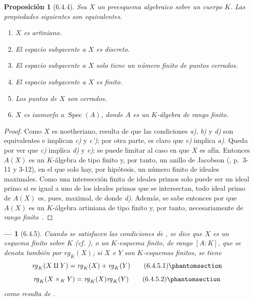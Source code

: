 \documentclass[oneside]{amsart}
\theoremstyle{ega-env-style}
\newtheorem*{env}{---}
\theoremstyle{ega-thm-env-style}
\newtheorem*{proposition}{Proposición}
\theoremstyle{ega-defn-env-style}
\let\EGAOriginalLabel\label
\renewcommand{\label}[1]{\phantomsection\EGAOriginalLabel{#1}}
\begin{document}
\begin{proposition}[6.4.4]
\label{I.6.4.4}
Sea $X$ un preesquema algebraico sobre un cuerpo $K$.
Las propiedades siguientes son equivalentes.
\begin{enumerate}
  \item[{\textup{a)}}] $X$ es artiniano.
  \item[{\textup{b)}}] El espacio subyacente a $X$ es discreto.
  \item[{\textup{c)}}] El espacio subyacente a $X$ solo tiene un número finito de puntos cerrados.
  \item[{\textup{c')}}] El espacio subyacente a $X$ es finito.
  \item[{\textup{d)}}] Los puntos de $X$ son cerrados.
  \item[{\textup{e)}}] $X$ es isomorfo a $\operatorname{Spec}(A)$, donde $A$ es un $K$-álgebra de rango finito.
\end{enumerate}
\end{proposition}

\begin{proof}
Como $X$ es noetheriano, resulta de  que las condiciones \emph{a)}, \emph{b)} y \emph{d)} son equivalentes e implican \emph{c)} y \emph{c')};
por otra parte, es claro que \emph{e)} implica \emph{a)}.
Queda por ver que \emph{c)} implica \emph{d)} y \emph{e)};
se puede limitar al caso en que $X$ es afín.
Entonces $A(X)$ es un $K$-álgebra de tipo finito  y, por tanto, un anillo de Jacobson (\cite{I-1}, p.~3-11 y 3-12), en el que solo hay, por hipótesis, un número finito de ideales maximales.
Como una intersección finita de ideales primos solo puede ser un ideal primo si es igual a uno de los ideales primos que se intersectan, todo ideal primo de $A(X)$ es, pues, maximal, de donde \emph{d)}.
Además, se sabe entonces por  que $A(X)$ es un $K$-álgebra artiniana de tipo finito y, por tanto, necesariamente de \emph{rango finito}~\cite{I-21}.
\end{proof}

\begin{env}[6.4.5]
\label{I.6.4.5}
Cuando se satisfacen las condiciones de , se dice que $X$ es un esquema \emph{finito sobre $K$} (cf. ), o un \emph{$K$-esquema finito}, de \emph{rango} $[A:K]$, que se denota también por $\mathit{rg}_K(X)$;
si $X$ e $Y$ son $K$-esquemas finitos, se tiene
\[
  \mathit{rg}_K(X\amalg Y)
  =\mathit{rg}_K(X)+\mathit{rg}_K(Y)
  \tag{6.4.5.1}\label{I.6.4.5.1-fr}
\]
\[
  \mathit{rg}_K(X\times_K Y)
  =\mathit{rg}_K(X)\mathit{rg}_K(Y)
  \tag{6.4.5.2}\label{I.6.4.5.2-fr}
\]
como resulta de .
\end{env}
\end{document}
